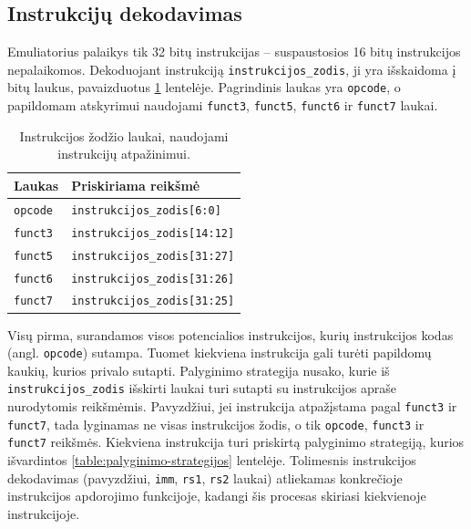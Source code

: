 \subsection{Instrukcijų dekodavimas}

Emuliatorius palaikys tik 32 bitų instrukcijas -- suspaustosios 16 bitų instrukcijos nepalaikomos. Dekoduojant instrukciją \texttt{instrukcijos\_zodis}, ji yra išskaidoma į bitų laukus, pavaizduotus \ref{table:funct-laukai} lentelėje. Pagrindinis laukas yra \texttt{opcode}, o papildomam atskyrimui naudojami \texttt{funct3}, \texttt{funct5}, \texttt{funct6} ir \texttt{funct7} laukai.

\begin{table}[h]
    \centering
    \small
    \begin{tabular}{|l|l|}
        \hline
        \textbf{Laukas} & \textbf{Priskiriama reikšmė} \\
        \hline
        \texttt{opcode} & \texttt{instrukcijos\_zodis[6:0]} \\
        \hline
        \texttt{funct3} & \texttt{instrukcijos\_zodis[14:12]} \\
        \hline
        \texttt{funct5} & \texttt{instrukcijos\_zodis[31:27]} \\
        \hline
        \texttt{funct6} & \texttt{instrukcijos\_zodis[31:26]} \\
        \hline
        \texttt{funct7} & \texttt{instrukcijos\_zodis[31:25]} \\
        \hline
    \end{tabular}
    \caption{Instrukcijos žodžio laukai, naudojami instrukcijų atpažinimui.}
    \label{table:funct-laukai}
\end{table}

Visų pirma, surandamos visos potencialios instrukcijos, kurių instrukcijos kodas (angl. \texttt{opcode}) sutampa. Tuomet kiekviena instrukcija gali turėti papildomų kaukių, kurios privalo sutapti. Palyginimo strategija nusako, kurie iš \texttt{instrukcijos\_zodis} išskirti laukai turi sutapti su instrukcijos apraše nurodytomis reikšmėmis. Pavyzdžiui, jei instrukcija atpažįstama pagal \texttt{funct3} ir \texttt{funct7}, tada lyginamas ne visas instrukcijos žodis, o tik \texttt{opcode}, \texttt{funct3} ir \texttt{funct7} reikšmės. Kiekviena instrukcija turi priskirtą palyginimo strategiją, kurios išvardintos \ref{table:palyginimo-strategijos} lentelėje. Tolimesnis instrukcijos dekodavimas (pavyzdžiui, \texttt{imm}, \texttt{rs1}, \texttt{rs2} laukai) atliekamas konkrečioje instrukcijos apdorojimo funkcijoje, kadangi šis procesas skiriasi kiekvienoje instrukcijoje.

